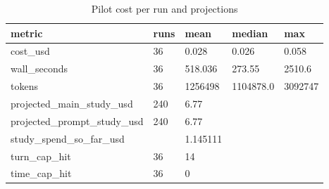 \begin{table}[t]
\centering\small
\caption{Pilot cost per run and projections}
\label{tab:pilot_cost}
\begin{tabular}{lllll}
\toprule
\textbf{metric} & \textbf{runs} & \textbf{mean} & \textbf{median} & \textbf{max} \\
\midrule
cost\_usd & 36 & 0.028 & 0.026 & 0.058 \\
wall\_seconds & 36 & 518.036 & 273.55 & 2510.6 \\
tokens & 36 & 1256498 & 1104878.0 & 3092747 \\
projected\_main\_study\_usd & 240 & 6.77 &  &  \\
projected\_prompt\_study\_usd & 240 & 6.77 &  &  \\
study\_spend\_so\_far\_usd &  & 1.145111 &  &  \\
turn\_cap\_hit & 36 & 14 &  &  \\
time\_cap\_hit & 36 & 0 &  &  \\
\bottomrule
\end{tabular}
\end{table}
